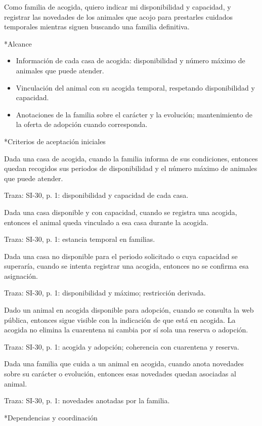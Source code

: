 \documentclass[10pt,a4paper]{article}
\makeatletter
\newcommand{\apartado}{\@startsection{subsection}{2}{\z@}{7pt}{3pt}{\normalfont\normalsize\bfseries\color{verde}}*}
\newenvironment{criterios}{\begin{description}[style=nextline,leftmargin=0pt,labelsep=0pt,font=\bfseries\color{verde},itemsep=5pt,topsep=3pt,parsep=0pt]}{\end{description}}
\newcommand{\historia}[1]{\begingroup\setlength{\fboxsep}{10pt}\colorbox{suave}{\parbox{\dimexpr\linewidth-20pt\relax}{#1}}\endgroup}
\newcommand{\traza}[1]{{\footnotesize\color{gris}Traza: SI-30, #1.}}
\makeatother
\begin{document}
\historia{Como familia de acogida, quiero indicar mi disponibilidad y capacidad, y registrar las novedades de los animales que acojo para prestarles cuidados temporales mientras siguen buscando una familia definitiva.}
\apartado{Alcance}
\begin{itemize}
\item Información de cada casa de acogida: disponibilidad y número máximo de animales que puede atender.
\item Vinculación del animal con su acogida temporal, respetando disponibilidad y capacidad.
\item Anotaciones de la familia sobre el carácter y la evolución; mantenimiento de la oferta de adopción cuando corresponda.
\end{itemize}
\apartado{Criterios de aceptación iniciales}
\begin{criterios}
\item[CA-06-01] Dada una casa de acogida, cuando la familia informa de sus condiciones, entonces quedan recogidos sus periodos de disponibilidad y el número máximo de animales que puede atender.\par\traza{p. 1: disponibilidad y capacidad de cada casa}
\item[CA-06-02] Dada una casa disponible y con capacidad, cuando se registra una acogida, entonces el animal queda vinculado a esa casa durante la acogida.\par\traza{p. 1: estancia temporal en familias}
\item[CA-06-03] Dada una casa no disponible para el periodo solicitado o cuya capacidad se superaría, cuando se intenta registrar una acogida, entonces no se confirma esa asignación.\par\traza{p. 1: disponibilidad y máximo; restricción derivada}
\item[CA-06-04] Dado un animal en acogida disponible para adopción, cuando se consulta la web pública, entonces sigue visible con la indicación de que está en acogida. La acogida no elimina la cuarentena ni cambia por sí sola una reserva o adopción.\par\traza{p. 1: acogida y adopción; coherencia con cuarentena y reserva}
\item[CA-06-05] Dada una familia que cuida a un animal en acogida, cuando anota novedades sobre su carácter o evolución, entonces esas novedades quedan asociadas al animal.\par\traza{p. 1: novedades anotadas por la familia}
\end{criterios}
\apartado{Dependencias y coordinación}
\end{document}
